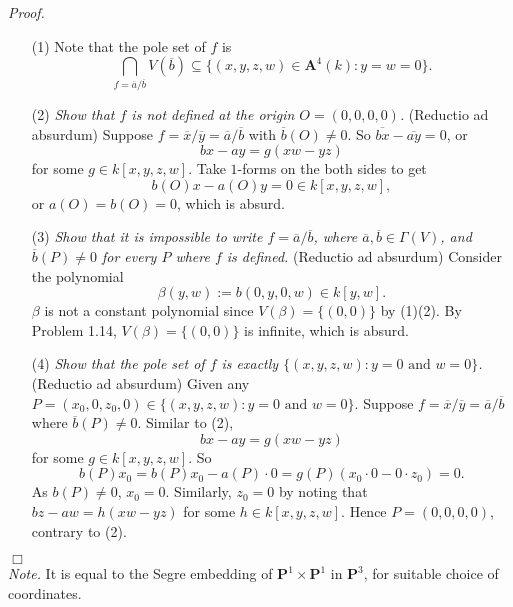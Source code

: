 \documentclass{article}
\begin{document}
\emph{Proof.}
\begin{enumerate}
\item[(1)]
   Note that the pole set of $f$ is
  \[
    \bigcap_{f = \overline{a}/\overline{b}} V(\overline{b})
    \subseteq \{ (x,y,z,w) \in \mathbf{A}^{4}(k) : y = w = 0 \}.
  \]

\item[(2)]
  \emph{Show that $f$ is not defined at the origin $O = (0,0,0,0)$.}
  (Reductio ad absurdum)
  Suppose $f = \overline{x}/\overline{y} = \overline{a}/\overline{b}$
  with $\overline{b}(O) \neq 0$.
  So $\overline{bx} - \overline{ay} = 0$, or
  \[
    bx - ay = g(xw - yz)
  \]
  for some $g \in k[x,y,z,w]$.
  Take $1$-forms on the both sides to get
  \[
    b(O) x - a(O) y = 0 \in k[x,y,z,w],
  \]
  or $a(O) = b(O) = 0$, which is absurd.

\item[(3)]
  \emph{Show that it is impossible to write $f = \overline{a}/\overline{b}$,
  where $\overline{a},\overline{b} \in \Gamma(V)$,
  and $\overline{b}(P) \neq 0$ for every $P$ where $f$ is defined.}
  (Reductio ad absurdum)
  Consider the polynomial
  \[
    \beta(y,w) := b(0,y,0,w) \in k[y,w].
  \]
  $\beta$ is not a constant polynomial since $V(\beta) = \{ (0,0) \}$ by (1)(2).
  By Problem 1.14, $V(\beta) = \{ (0,0) \}$ is infinite, which is absurd.

\item[(4)]
  \emph{Show that the pole set of $f$ is exactly $\{ (x,y,z,w) : y = 0 \text{ and } w = 0 \}$.}
  (Reductio ad absurdum)
  Given any $P = (x_0,0,z_0,0) \in \{ (x,y,z,w) : y = 0 \text{ and } w = 0 \}$.
  Suppose $f = \overline{x}/\overline{y} = \overline{a}/\overline{b}$
  where $\overline{b}(P) \neq 0$.
  Similar to (2),
  \[
    bx - ay = g(xw - yz)
  \]
  for some $g \in k[x,y,z,w]$.
  So
  \[
    b(P) x_0 = b(P) x_0 - a(P) \cdot 0 = g(P) (x_0 \cdot 0 - 0 \cdot z_0) = 0.
  \]
  As $b(P) \neq 0$, $x_0 = 0$.
  Similarly, $z_0 = 0$ by noting that $bz - aw = h(xw - yz)$ for some $h \in k[x,y,z,w]$.
  Hence $P = (0,0,0,0)$, contrary to (2).
\end{enumerate}
$\Box$ \\

\emph{Note.}
  It is equal to the Segre embedding of $\mathbf{P}^1 \times \mathbf{P}^1$
  in $\mathbf{P}^3$, for suitable choice of coordinates. \\\\



\end{document}
